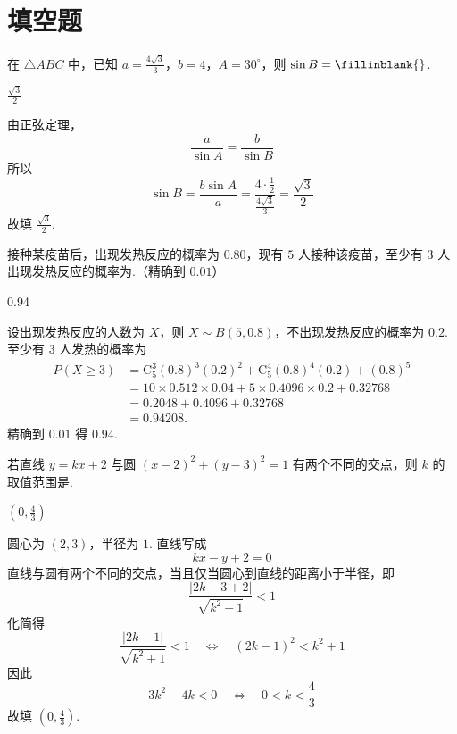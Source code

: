 \section{填空题}
\begin{problem}
在 \(\triangle ABC\) 中，已知 \(a = \frac{4\sqrt{3}}{3}\)，\(b = 4\)，\(A = 30^{\circ}\)，则 \(\sin B =\fillinblank{}\).
\end{problem}

\begin{answer}
\(\frac{\sqrt{3}}{2}\)
\end{answer}

\begin{solution}
由正弦定理，
\[
\frac{a}{\sin A}=\frac{b}{\sin B}
\]
所以
\[
\sin B=\frac{b\sin A}{a}
=\frac{4\cdot\frac12}{\frac{4\sqrt3}{3}}
=\frac{\sqrt3}{2}
\]
故填 \(\frac{\sqrt3}{2}\).
\end{solution}

\begin{problem}
接种某疫苗后，出现发热反应的概率为 \(0.80\)，现有 \(5\) 人接种该疫苗，至少有 \(3\) 人出现发热反应的概率为\fillinblank{}.（精确到 \(0.01\)）
\end{problem}

\begin{answer}
0.94
\end{answer}

\begin{solution}
设出现发热反应的人数为 \(X\)，则 \(X\sim B(5,0.8)\)，不出现发热反应的概率为 \(0.2\). 至少有 \(3\) 人发热的概率为
\[
\begin{aligned}
P(X\geqslant3)
&=\mathrm C_5^3(0.8)^3(0.2)^2+\mathrm C_5^4(0.8)^4(0.2)+(0.8)^5\\
&=10\times0.512\times0.04+5\times0.4096\times0.2+0.32768\\
&=0.2048+0.4096+0.32768\\
&=0.94208.
\end{aligned}
\]
精确到 \(0.01\) 得 \(0.94\).
\end{solution}

\begin{problem}
若直线 \( y = kx + 2 \) 与圆 \( (x - 2)^2 + (y - 3)^2 = 1 \) 有两个不同的交点，则 \( k \) 的取值范围是\fillinblank{}.
\end{problem}

\begin{answer}
\(\left(0,\frac{4}{3}\right)\)
\end{answer}

\begin{solution}
圆心为 \((2,3)\)，半径为 \(1\). 直线写成
\[
kx-y+2=0
\]
直线与圆有两个不同的交点，当且仅当圆心到直线的距离小于半径，即
\[
\frac{|2k-3+2|}{\sqrt{k^2+1}}<1
\]
化简得
\[
\frac{|2k-1|}{\sqrt{k^2+1}}<1
\quad\Longleftrightarrow\quad
(2k-1)^2<k^2+1
\]
因此
\[
3k^2-4k<0
\quad\Longleftrightarrow\quad
0<k<\frac43
\]
故填 \(\left(0,\frac43\right)\).
\end{solution}

